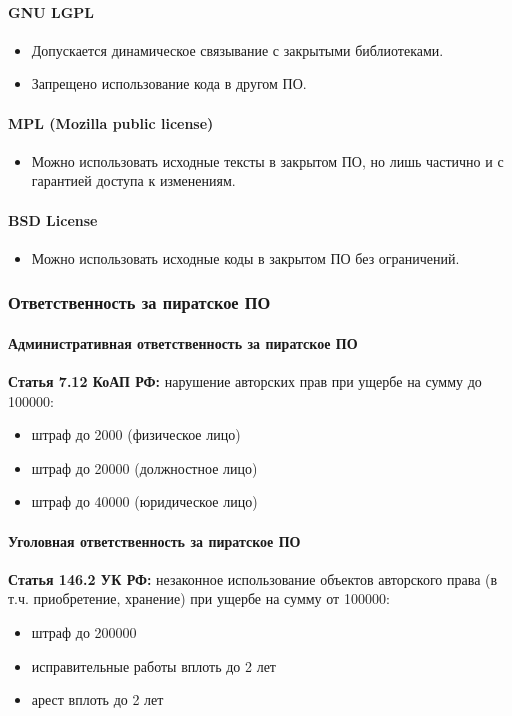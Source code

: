 \paragraph*{GNU LGPL}
\begin{itemize}
    \item Допускается динамическое связывание с закрытыми библиотеками.
    \item Запрещено использование кода в другом ПО.
\end{itemize}

\paragraph*{MPL (Mozilla public license)}
\begin{itemize}
    \item Можно использовать исходные тексты в закрытом ПО, но лишь частично и с гарантией доступа к изменениям.
\end{itemize}

\paragraph*{BSD License}
\begin{itemize}
    \item Можно использовать исходные коды в закрытом ПО без ограничений.
\end{itemize}

\subsubsection{Ответственность за пиратское ПО}\label{subsubsec:pirated-software-responsibility}

\paragraph*{Административная ответственность за пиратское ПО}
\textbf{Статья 7.12 КоАП РФ:} нарушение авторских прав при ущербе на сумму до \qty{100000}{\rub}:
\begin{itemize}
    \item штраф до \qty{2000}{\rub} (физическое лицо)
    \item штраф до \qty{20000}{\rub} (должностное лицо)
    \item штраф до \qty{40000}{\rub} (юридическое лицо)
\end{itemize}

\paragraph*{Уголовная ответственность за пиратское ПО}
\textbf{Статья 146.2 УК РФ:} незаконное использование объектов авторского права (в т.ч. приобретение, хранение) при ущербе на сумму от \qty{100000}{\rub}:
\begin{itemize}
    \item штраф до \qty{200000}{\rub}
    \item исправительные работы вплоть до 2 лет
    \item арест вплоть до 2 лет
\end{itemize}

